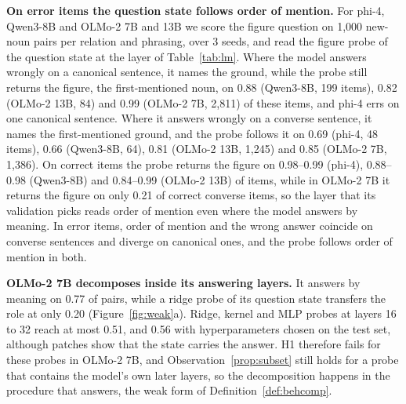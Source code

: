 \textbf{On error items the question state follows order of mention.} For phi-4, Qwen3-8B and OLMo-2 7B and 13B we score the figure question on 1{,}000 new-noun pairs per relation and phrasing, over 3 seeds, and read the figure probe of the question state at the layer of Table~\ref{tab:lm}. Where the model answers wrongly on a canonical sentence, it names the ground, while the probe still returns the figure, the first-mentioned noun, on 0.88 (Qwen3-8B, 199 items), 0.82 (OLMo-2 13B, 84) and 0.99 (OLMo-2 7B, 2{,}811) of these items, and phi-4 errs on one canonical sentence. Where it answers wrongly on a converse sentence, it names the first-mentioned ground, and the probe follows it on 0.69 (phi-4, 48 items), 0.66 (Qwen3-8B, 64), 0.81 (OLMo-2 13B, 1{,}245) and 0.85 (OLMo-2 7B, 1{,}386). On correct items the probe returns the figure on 0.98--0.99 (phi-4), 0.88--0.98 (Qwen3-8B) and 0.84--0.99 (OLMo-2 13B) of items, while in OLMo-2 7B it returns the figure on only 0.21 of correct converse items, so the layer that its validation picks reads order of mention even where the model answers by meaning. In error items, order of mention and the wrong answer coincide on converse sentences and diverge on canonical ones, and the probe follows order of mention in both.

\textbf{OLMo-2 7B decomposes inside its answering layers.} It answers by meaning on 0.77 of pairs, while a ridge probe of its question state transfers the role at only 0.20 (Figure~\ref{fig:weak}a). Ridge, kernel and MLP probes at layers 16 to 32 reach at most 0.51, and 0.56 with hyperparameters chosen on the test set, although patches show that the state carries the answer. H1 therefore fails for these probes in OLMo-2 7B, and Observation~\ref{prop:subset} still holds for a probe that contains the model's own later layers, so the decomposition happens in the procedure that answers, the weak form of Definition~\ref{def:behcomp}.

